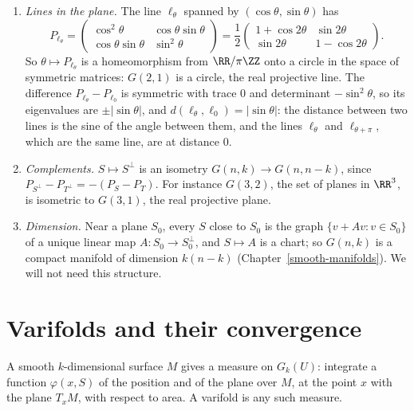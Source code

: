 \begin{example}\label{varifolds:example-grassmannian}
\begin{enumerate}
\item \emph{Lines in the plane.} The line $\ell_\theta$ spanned by $(\cos\theta, \sin\theta)$ has
\[
P_{\ell_\theta} = \begin{pmatrix}\cos^2\theta & \cos\theta\sin\theta \\ \cos\theta\sin\theta & \sin^2\theta\end{pmatrix} = \frac12\begin{pmatrix}1 + \cos2\theta & \sin2\theta \\ \sin2\theta & 1 - \cos2\theta\end{pmatrix}.
\]
So $\theta \mapsto P_{\ell_\theta}$ is a homeomorphism from $\RR/\pi\ZZ$ onto a circle in the space of symmetric matrices: $G(2, 1)$ is a circle, the real projective line. The difference
$P_{\ell_\theta} - P_{\ell_0}$ is symmetric with trace $0$ and determinant $-\sin^2\theta$, so its eigenvalues are $\pm|\sin\theta|$, and $d(\ell_\theta, \ell_0) = |\sin\theta|$: the distance between two
lines is the sine of the angle between them, and the lines $\ell_\theta$ and $\ell_{\theta + \pi}$, which are the same line, are at distance $0$.
\item \emph{Complements.} $S \mapsto S^\perp$ is an isometry $G(n, k) \to G(n, n - k)$, since $P_{S^\perp} - P_{T^\perp} = -(P_S - P_T)$. For instance $G(3, 2)$, the set of planes in $\RR^3$, is
isometric to $G(3, 1)$, the real projective plane.
\item \emph{Dimension.} Near a plane $S_0$, every $S$ close to $S_0$ is the graph $\{v + Av : v \in S_0\}$ of a unique linear map $A \colon S_0 \to S_0^\perp$, and $S \mapsto A$ is a chart; so $G(n, k)$ is
a compact manifold of dimension $k(n - k)$ (Chapter~\ref{smooth-manifolds}). We will not need this structure.
\end{enumerate}
\end{example}

\section{Varifolds and their convergence}\label{varifolds:section-varifolds}

A smooth $k$-dimensional surface $M$ gives a measure on $G_k(U)$: integrate a function $\varphi(x, S)$ of the position and of the plane over $M$, at the point $x$ with the plane $T_xM$, with respect to area.
A varifold is any such measure.

